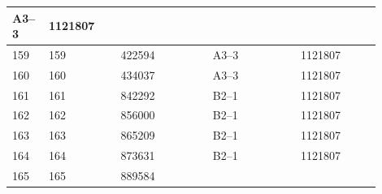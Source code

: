\documentclass[UTF8,10pt,a4paper,fontset=fandol]{ctexart}
\newcommand{\fieldvalue}[1]{#1}
\begin{document}
\begin{center}
\begin{tabular}{|p{0.07\linewidth}|p{0.18\linewidth}|p{0.23\linewidth}|p{0.22\linewidth}|p{0.20\linewidth}|}
\fieldvalue{A3--3} &
\fieldvalue{1121807} & \\
\hline
159 &
\fieldvalue{159} &
\fieldvalue{422594} &
\fieldvalue{A3--3} &
\fieldvalue{1121807} & \\
\hline
160 &
\fieldvalue{160} &
\fieldvalue{434037} &
\fieldvalue{A3--3} &
\fieldvalue{1121807} & \\
\hline
161 &
\fieldvalue{161} &
\fieldvalue{842292} &
\fieldvalue{B2--1} &
\fieldvalue{1121807} & \\
\hline
162 &
\fieldvalue{162} &
\fieldvalue{856000} &
\fieldvalue{B2--1} &
\fieldvalue{1121807} & \\
\hline
163 &
\fieldvalue{163} &
\fieldvalue{865209} &
\fieldvalue{B2--1} &
\fieldvalue{1121807} & \\
\hline
164 &
\fieldvalue{164} &
\fieldvalue{873631} &
\fieldvalue{B2--1} &
\fieldvalue{1121807} & \\
\hline
165 &
\fieldvalue{165} &
\fieldvalue{889584} &

\end{tabular}
\end{center}
\end{document}
